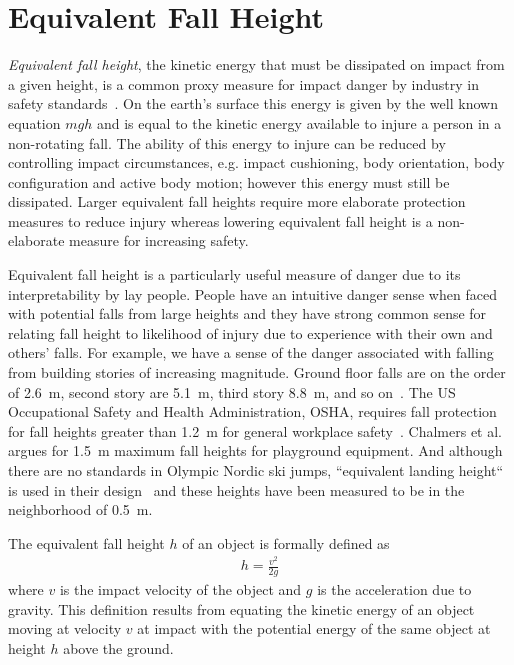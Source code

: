 \documentclass{article}
\begin{document}
\section{Equivalent Fall Height}
%
\emph{Equivalent fall height}, the kinetic energy that must be dissipated on
impact from a given height, is a common proxy measure for impact danger by
industry in safety standards~\cite{Hubbard2012}. On the earth's surface this
energy is given by the well known equation $mgh$ and is equal to the kinetic
energy available to injure a person in a non-rotating fall. The ability of this
energy to injure can be reduced by controlling impact circumstances, e.g.
impact cushioning, body orientation, body configuration and active body motion;
however this energy must still be dissipated. Larger equivalent fall heights
require more elaborate protection measures to reduce injury whereas lowering
equivalent fall height is a non-elaborate measure for increasing safety.

Equivalent fall height is a particularly useful measure of danger due to its
interpretability by lay people. People have an intuitive danger sense when
faced with potential falls from large heights and they have strong common sense
for relating fall height to likelihood of injury due to experience with their
own and others' falls. For example, we have a sense of the danger associated
with falling from building stories of increasing magnitude. Ground floor falls
are on the order of 2.6~\si{\meter}, second story are 5.1~\si{\meter}, third
story 8.8~\si{\meter}, and so on~\cite{Vish2005}. The US Occupational Safety
and Health Administration, OSHA, requires fall protection for fall heights
greater than 1.2~\si{\meter} for general workplace safety~\cite{OSHA2021}.
Chalmers et al.~\cite{Chalmers1996} argues for 1.5~\si{\meter} maximum fall
heights for playground equipment. And although there are no standards in
Olympic Nordic ski jumps, ``equivalent landing height`` is used in their
design~\cite{Gasser2018} and these heights have been measured to be in the
neighborhood of 0.5~\si{\meter}.

The equivalent fall height $h$ of an object is formally defined as
%
\begin{align} h = \frac{v^2}{2g} \label{eq:efh_general} \end{align}
%
where $v$ is the impact velocity of the object and $g$ is the acceleration due
to gravity. This definition results from equating the kinetic energy of an
object moving at velocity $v$ at impact with the potential energy of the same
object at height $h$ above the ground.
\end{document}
